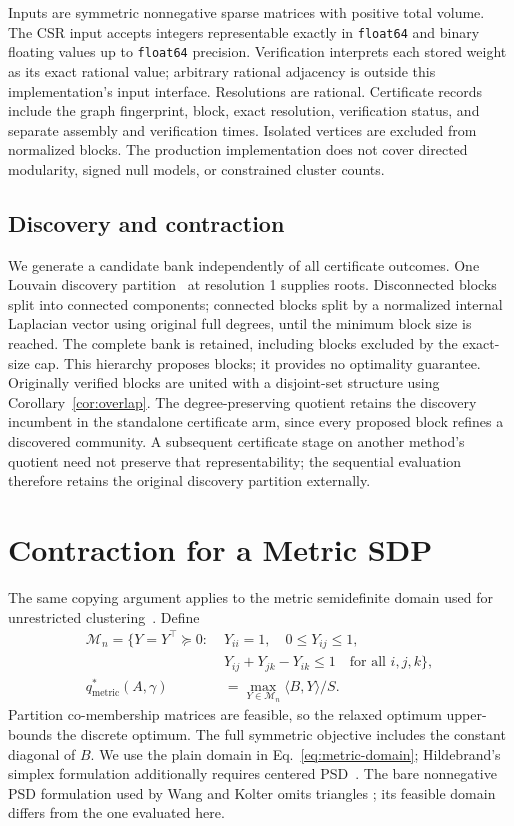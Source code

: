 \documentclass[sigconf,anonymous,review]{acmart}
\newcommand{\1}{\mathbf{1}}
\begin{document}
Inputs are symmetric nonnegative sparse matrices with positive total volume.
The CSR input accepts integers representable exactly in \texttt{float64} and binary
floating values up to \texttt{float64} precision. Verification interprets each stored
weight as its exact rational value; arbitrary rational adjacency is outside
this implementation's input interface. Resolutions are rational. Certificate records include
the graph fingerprint, block, exact resolution, verification status, and
separate assembly and verification times. Isolated vertices are excluded from
normalized blocks. The production implementation does not cover directed
modularity, signed null models, or constrained cluster counts.

\subsection{Discovery and contraction}
We generate a candidate bank independently of all certificate outcomes.
One Louvain discovery partition~\cite{blondel2008fast} at resolution 1 supplies roots. Disconnected
blocks split into connected components; connected blocks split by a normalized
internal Laplacian vector using original full degrees, until the minimum block
size is reached. The complete bank is retained, including blocks excluded by
the exact-size cap. This hierarchy proposes blocks; it provides no optimality
guarantee. Originally verified blocks are united with a disjoint-set structure
using Corollary~\ref{cor:overlap}. The degree-preserving quotient retains
the discovery incumbent in the standalone certificate arm, since every proposed
block refines a discovered community. A subsequent certificate stage on another
method's quotient need not preserve that representability; the sequential
evaluation therefore retains the original discovery partition externally.

\section{Contraction for a Metric SDP}\label{sec:metric-application}
The same copying argument applies to the metric semidefinite domain used
for unrestricted clustering~\cite{mathieu2010correlation}. Define
\begin{align}
\mathcal M_n=\{Y=Y^\top\succeq0:\;&Y_{ii}=1,\quad 0\leq Y_{ij}\leq1,\nonumber\\
 &Y_{ij}+Y_{jk}-Y_{ik}\leq1\quad\text{for all }i,j,k\},\label{eq:metric-domain}\\
 q^*_{\mathrm{metric}}(A,\gamma)
 &=\max_{Y\in\mathcal M_n}\langle B,Y\rangle/S.\label{eq:metric-objective}
\end{align}
Partition co-membership matrices are feasible, so the relaxed optimum
upper-bounds the discrete optimum. The full symmetric objective includes
the constant diagonal of $B$. We use the plain domain in
Eq.~\eqref{eq:metric-domain}; Hildebrand's simplex formulation additionally
requires centered PSD~\cite{hildebrand2008convex}.
The bare nonnegative PSD formulation used by Wang and Kolter omits triangles
\cite{wang2020community}; its feasible domain differs from the one evaluated
here.
\end{document}
